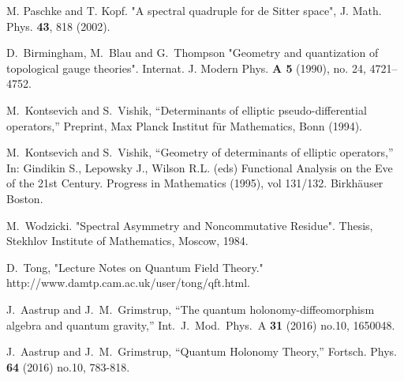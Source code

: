 \documentclass[12pt]{article}
\begin{document}
\begin{thebibliography}{99}
M. Paschke and T. Kopf.
"A spectral quadruple for de Sitter space",
J. Math. Phys. {\bf 43}, 818 (2002).






D.~Birmingham, M.~Blau and G.~Thompson "Geometry and quantization of topological gauge theories". Internat. J. Modern Phys. {\bf A 5} (1990), no. 24, 4721--4752.








M.~Kontsevich and S.~Vishik,
``Determinants of elliptic pseudo-differential operators,''
Preprint, Max Planck Institut f\"{u}r Mathematics, Bonn (1994).



M.~Kontsevich and S.~Vishik,
``Geometry of determinants of elliptic operators,''
 In: Gindikin S., Lepowsky J., Wilson R.L. (eds) Functional Analysis on the Eve of the 21st Century. Progress in Mathematics (1995), vol 131/132. Birkh\"{a}user Boston.




M.~Wodzicki. "Spectral Asymmetry and Noncommutative Residue". Thesis, Stekhlov Institute
of Mathematics, Moscow, 1984.







  
   D.~Tong,
   "Lecture Notes on Quantum Field Theory."
http://www.damtp.cam.ac.uk/user/tong/qft.html.









  J.~Aastrup and J.~M.~Grimstrup,
  ``The quantum holonomy-diffeomorphism algebra and quantum gravity,''
  Int.\ J.\ Mod.\ Phys.\ A {\bf 31} (2016) no.10,  1650048.




J.~Aastrup and J.~M.~Grimstrup,
``Quantum Holonomy Theory,''
Fortsch. Phys. \textbf{64} (2016) no.10, 783-818.



























\end{thebibliography}
\end{document}
